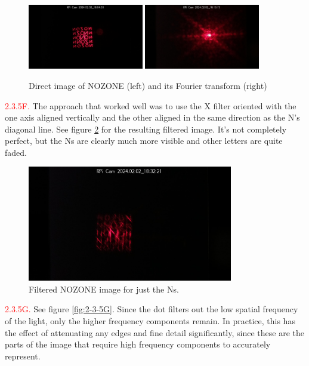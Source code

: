 \documentclass[letterpaper, reqno,11pt]{article}
\begin{document}
\begin{figure}[tb]
    \centering
    \includegraphics[width=0.45\textwidth]{Fourier/5e/media/im_0211_20240202_180403.jpg}
    \includegraphics[width=0.45\textwidth]{Fourier/5e/media/im_0216_20240202_181315.jpg}
    \caption{Direct image of NOZONE (left) and its Fourier transform (right)}
    \label{fig:2-3-5E}
\end{figure}

\noindent \textcolor{red}{2.3.5F.} The approach that worked well was to use the X filter oriented with the one axis aligned vertically and the other aligned in the same direction as the N's diagonal line. See figure \ref{fig:2-3-5F} for the resulting filtered image. It's not completely perfect, but the Ns are clearly much more visible and other letters are quite faded.

\begin{figure}[tb]
    \centering
    \includegraphics[width=0.8\textwidth]{Fourier/5f/media/im_0219_20240202_183221.jpg}
    \caption{Filtered NOZONE image for just the Ns.}
    \label{fig:2-3-5F}
\end{figure}

\noindent \textcolor{red}{2.3.5G.} See figure \ref{fig:2-3-5G}. Since the dot filters out the low spatial frequency of the light, only the higher frequency components remain. In practice, this has the effect of attenuating any edges and fine detail significantly, since these are the parts of the image that require high frequency components to accurately represent.
\end{document}
